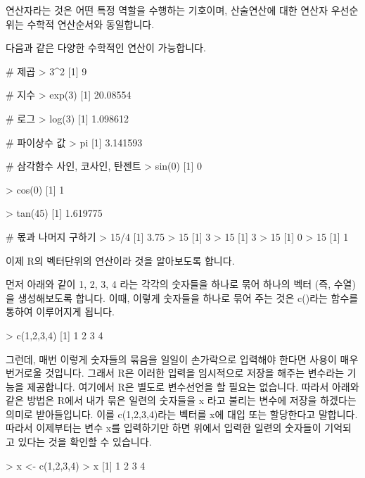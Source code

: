 \documentclass{book}
\begin{document}
연산자라는 것은 어떤 특정 역할을 수행하는 기호이며, 산술연산에 대한  연산자 우선순위는 수학적 연산순서와 동일합니다. 

다음과 같은 다양한 수학적인 연산이 가능합니다. 

\begin{Schunk}
	\begin{Soutput}
# 제곱 
> 3^2
[1] 9

# 지수 
> exp(3)
[1] 20.08554
 
# 로그 
> log(3)
[1] 1.098612
 
# 파이상수 값 
> pi
[1] 3.141593

# 삼각함수 사인, 코사인, 탄젠트  
> sin(0)
[1] 0

> cos(0)
[1] 1

> tan(45)
[1] 1.619775
 
# 몫과 나머지 구하기 
> 15/4
[1] 3.75
> 15 %
[1] 3
> 15 %
[1] 3
> 15 %
[1] 0
> 15 %
[1] 1
 
\end{Soutput}
\end{Schunk}

이제 R의 벡터단위의 연산이라 것을 알아보도록 합니다. 

먼저 아래와 같이 1, 2, 3, 4 라는 각각의 숫자들을 하나로 묶어 하나의 벡터 (즉, 수열)을 생성해보도록 합니다. 
이때, 이렇게 숫자들을 하나로 묶어 주는 것은 c()라는 함수를 통하여 이루어지게 됩니다.

\begin{Schunk}
\begin{Soutput}
> c(1,2,3,4)
[1] 1 2 3 4
\end{Soutput}
\end{Schunk}

그런데, 매번 이렇게 숫자들의 묶음을 일일이 손가락으로 입력해야 한다면 사용이 매우 번거로울 것입니다. 
그래서 R은 이러한 입력을 임시적으로 저장을 해주는 변수라는 기능을 제공합니다. 여기에서 R은 별도로 변수선언을 할 필요는 없습니다.
따라서 아래와 같은 방법은 R에서 내가 묶은 일련의 숫자들을 x 라고 불리는 변수에 저장을 하겠다는 의미로 받아들입니다.
이를 c(1,2,3,4)라는 벡터를 x에 대입 또는 할당한다고 말합니다.
따라서 이제부터는 변수 x를 입력하기만 하면 위에서 입력한 일련의 숫자들이 기억되고 있다는 것을 확인할 수 있습니다. 

\begin{Schunk}
\begin{Soutput}
> x <- c(1,2,3,4)
> x
[1] 1 2 3 4
\end{Soutput}
\end{Schunk}
\end{document}
